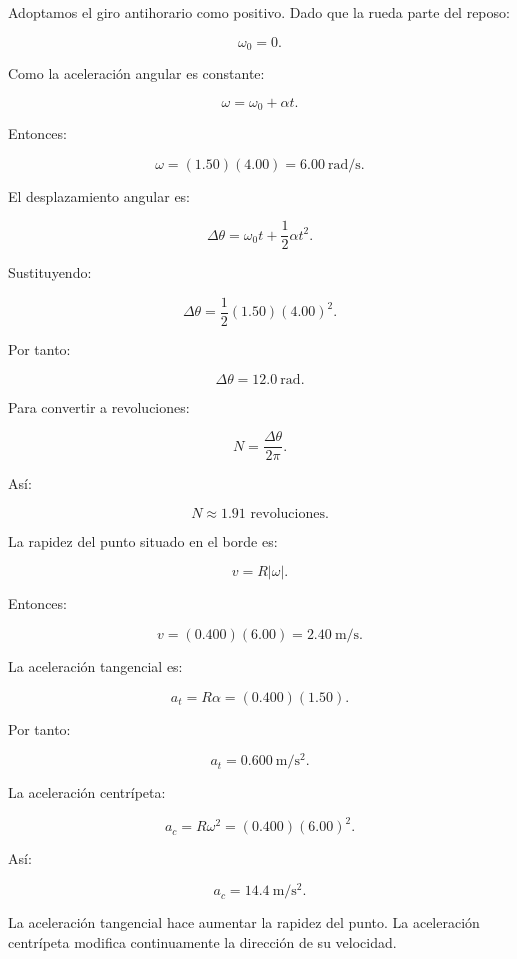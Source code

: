 \begin{explicacion}
Adoptamos el giro antihorario como positivo. Dado que la
rueda parte del reposo:

\[
\omega_0=0.
\]

Como la aceleración angular es constante:

\[
\omega=\omega_0+\alpha t.
\]

Entonces:

\[
\omega=(1.50)(4.00)
=\boxed{\SI{6.00}{\radian\per\second}}.
\]

El desplazamiento angular es:

\[
\Delta\theta=\omega_0t+\frac12\alpha t^2.
\]

Sustituyendo:

\[
\Delta\theta=\frac12(1.50)(4.00)^2.
\]

Por tanto:

\[
\boxed{\Delta\theta=\SI{12.0}{\radian}}.
\]

Para convertir a revoluciones:

\[
N=\frac{\Delta\theta}{2\pi}.
\]

Así:

\[
\boxed{N\approx1.91\text{ revoluciones}}.
\]

La rapidez del punto situado en el borde es:

\[
v=R|\omega|.
\]

Entonces:

\[
v=(0.400)(6.00)
=\boxed{\SI{2.40}{\meter\per\second}}.
\]

La aceleración tangencial es:

\[
a_t=R\alpha=(0.400)(1.50).
\]

Por tanto:

\[
\boxed{a_t=\SI{0.600}{\meter\per\second\squared}}.
\]

La aceleración centrípeta:

\[
a_c=R\omega^2=(0.400)(6.00)^2.
\]

Así:

\[
\boxed{a_c=\SI{14.4}{\meter\per\second\squared}}.
\]

La aceleración tangencial hace aumentar la rapidez del punto.
La aceleración centrípeta modifica continuamente la dirección
de su velocidad.
\end{explicacion}


